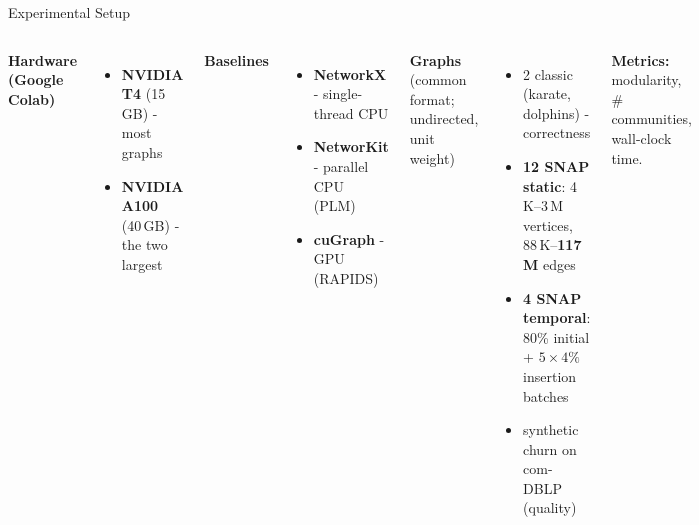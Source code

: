 \documentclass[aspectratio=169]{beamer}
\begin{document}
\begin{frame}{Experimental Setup}
    \begin{columns}
        \textbf{Hardware (Google Colab)}
        \begin{itemize}\small
            \item \textbf{NVIDIA T4} (15\,GB) - most graphs
            \item \textbf{NVIDIA A100} (40\,GB) - the two largest
        \end{itemize}
        \textbf{Baselines}
        \begin{itemize}\small
            \item \textbf{NetworkX} - single-thread CPU
            \item \textbf{NetworKit} - parallel CPU (PLM)
            \item \textbf{cuGraph} - GPU (RAPIDS)
        \end{itemize}
        \textbf{Graphs} (common format; undirected, unit weight)
        \begin{itemize}\small
            \item 2 classic (karate, dolphins) - correctness
            \item \textbf{12 SNAP static}: 4\,K--3\,M vertices,
            88\,K--\textbf{117\,M} edges
            \item \textbf{4 SNAP temporal}: 80\% initial + $5\times4\%$ insertion batches
            \item synthetic churn on com-DBLP (quality)
        \end{itemize}
        \textbf{Metrics:} modularity, \# communities, wall-clock time.
    \end{columns}
\end{frame}
\end{document}
